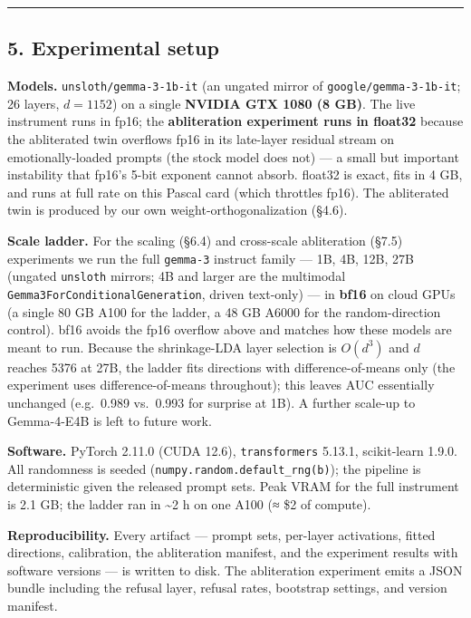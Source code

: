 \documentclass[
]{article}
\begin{document}
\begin{center}\rule{0.5\linewidth}{0.5pt}\end{center}

\subsection{5. Experimental setup}\label{experimental-setup}

\textbf{Models.} \texttt{unsloth/gemma-3-1b-it} (an ungated mirror of
\texttt{google/gemma-3-1b-it}; 26 layers, \(d=1152\)) on a single
\textbf{NVIDIA GTX 1080 (8 GB)}. The live instrument runs in fp16; the
\textbf{abliteration experiment runs in float32} because the abliterated
twin overflows fp16 in its late-layer residual stream on
emotionally-loaded prompts (the stock model does not) --- a small but
important instability that fp16's 5-bit exponent cannot absorb. float32
is exact, fits in 4 GB, and runs at full rate on this Pascal card (which
throttles fp16). The abliterated twin is produced by our own
weight-orthogonalization (§4.6).

\textbf{Scale ladder.} For the scaling (§6.4) and cross-scale
abliteration (§7.5) experiments we run the full \texttt{gemma-3}
instruct family --- 1B, 4B, 12B, 27B (ungated \texttt{unsloth} mirrors;
4B and larger are the multimodal
\texttt{Gemma3ForConditionalGeneration}, driven text-only) --- in
\textbf{bf16} on cloud GPUs (a single 80 GB A100 for the ladder, a 48 GB
A6000 for the random-direction control). bf16 avoids the fp16 overflow
above and matches how these models are meant to run. Because the
shrinkage-LDA layer selection is \(O(d^3)\) and \(d\) reaches 5376 at
27B, the ladder fits directions with difference-of-means only (the
experiment uses difference-of-means throughout); this leaves AUC
essentially unchanged (e.g.~0.989 vs.~0.993 for surprise at 1B). A
further scale-up to Gemma-4-E4B is left to future work.

\textbf{Software.} PyTorch 2.11.0 (CUDA 12.6), \texttt{transformers}
5.13.1, scikit-learn 1.9.0. All randomness is seeded
(\texttt{numpy.random.default\_rng(b)}); the pipeline is deterministic
given the released prompt sets. Peak VRAM for the full instrument is 2.1
GB; the ladder ran in \textasciitilde2 h on one A100 (≈ \$2 of compute).

\textbf{Reproducibility.} Every artifact --- prompt sets, per-layer
activations, fitted directions, calibration, the abliteration manifest,
and the experiment results with software versions --- is written to
disk. The abliteration experiment emits a JSON bundle including the
refusal layer, refusal rates, bootstrap settings, and version manifest.
\end{document}
